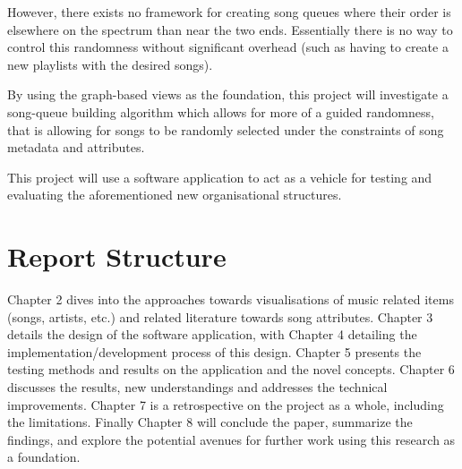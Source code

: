 However, there exists no framework for creating song queues where their order is elsewhere on the spectrum than near the two ends. Essentially there is no way to control this randomness without significant overhead (such as having to create a new playlists with the desired songs).


By using the graph-based views as the foundation, this project will investigate a song-queue building algorithm which allows for more of a guided randomness, that is allowing for songs to be randomly selected under the constraints of song metadata and attributes.

This project will use a software application to act as a vehicle for testing and evaluating the aforementioned new organisational structures.



\section{Report Structure}
Chapter 2 dives into the approaches towards visualisations of music related items (songs, artists, etc.) and related literature towards song attributes. Chapter 3 details the design of the software application, with Chapter 4 detailing the implementation/development process of this design. Chapter 5 presents the testing methods and results on the application and the novel concepts. Chapter 6 discusses the results, new understandings and addresses the technical improvements. Chapter 7 is a retrospective on the project as a whole, including the limitations. Finally Chapter 8 will conclude the paper, summarize the findings, and explore the potential avenues for further work using this research as a foundation.
